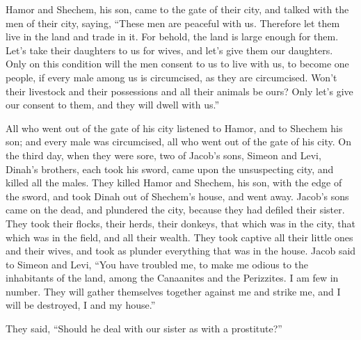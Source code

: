 {Hamor and Shechem, his son, came to the gate of their city, and talked with the men of their city, saying,
“These men are peaceful with us. Therefore let them live in the land and trade in it. For behold, the land is large enough for them. Let’s take their daughters to us for wives, and let’s give them our daughters.
Only on this condition will the men consent to us to live with us, to become one people, if every male among us is circumcised, as they are circumcised.
Won’t their livestock and their possessions and all their animals be ours? Only let’s give our consent to them, and they will dwell with us.”
\par }{\PP {}All who went out of the gate of his city listened to Hamor, and to Shechem his son; and every male was circumcised, all who went out of the gate of his city.
On the third day, when they were sore, two of Jacob’s sons, Simeon and Levi, Dinah’s brothers, each took his sword, came upon the unsuspecting city, and killed all the males.
They killed Hamor and Shechem, his son, with the edge of the sword, and took Dinah out of Shechem’s house, and went away.
Jacob’s sons came on the dead, and plundered the city, because they had defiled their sister.
They took their flocks, their herds, their donkeys, that which was in the city, that which was in the field,
and all their wealth. They took captive all their little ones and their wives, and took as plunder everything that was in the house.
Jacob said to Simeon and Levi, “You have troubled me, to make me odious to the inhabitants of the land, among the Canaanites and the Perizzites. I am few in number. They will gather themselves together against me and strike me, and I will be destroyed, I and my house.”
\par }{\PP {}They said, “Should he deal with our sister as with a prostitute?”

}
